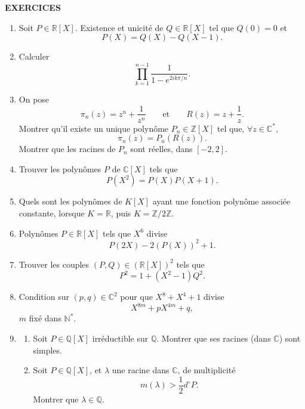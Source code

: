 
\begin{center}
{\Large\sffamily\bfseries\color{BellaLavenderDeep} EXERCICES}
\end{center}
\vspace{0.8em}

\begin{enumerate}[label=\arabic*.,leftmargin=2.2em,itemsep=1.1em]

\item Soit $P\in\mathbb R[X]$. Existence et unicité de $Q\in\mathbb R[X]$ tel que $Q(0)=0$ et
\[
P(X)=Q(X)-Q(X-1).
\]

\item Calculer
\[
\prod_{k=1}^{n-1}\frac1{1-e^{2ik\pi/n}}.
\]

\item On pose
\[
\pi_n(z)=z^n+\frac1{z^n}\qquad\text{et}\qquad R(z)=z+\frac1z.
\]
Montrer qu'il existe un unique polynôme $P_n\in\mathbb Z[X]$ tel que, $\forall z\in\mathbb C^*$,
\[
\pi_n(z)=P_n(R(z)).
\]
Montrer que les racines de $P_n$ sont réelles, dans $[-2,2]$.

\item Trouver les polynômes $P$ de $\mathbb C[X]$ tels que
\[
P(X^2)=P(X)P(X+1).
\]

\item Quels sont les polynômes de $K[X]$ ayant une fonction polynôme associée constante, lorsque $K=\mathbb R$, puis $K=\mathbb Z/2\mathbb Z$.

\item Polynômes $P\in\mathbb R[X]$ tels que $X^6$ divise
\[
P(2X)-2(P(X))^2+1.
\]

\item Trouver les couples $(P,Q)\in(\mathbb R[X])^2$ tels que
\[
P^2=1+(X^2-1)Q^2.
\]

\item Condition sur $(p,q)\in\mathbb C^2$ pour que $X^8+X^4+1$ divise
\[
X^{8m}+pX^{4m}+q,
\]
$m$ fixé dans $\mathbb N^*$.

\item
\begin{enumerate}[label=\arabic*),leftmargin=2em]
\item Soit $P\in\mathbb Q[X]$ irréductible sur $\mathbb Q$. Montrer que ses racines (dans $\mathbb C$) sont simples.
\item Soit $P\in\mathbb Q[X]$, et $\lambda$ une racine dans $\mathbb C$, de multiplicité
\[
m(\lambda)>\frac12d^\circ P.
\]
Montrer que $\lambda\in\mathbb Q$.
\end{enumerate}


\end{enumerate}
